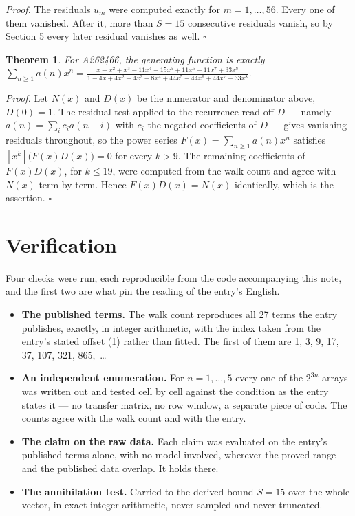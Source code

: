\documentclass[11pt]{article}
\newtheorem{theorem}{Theorem}
\theoremstyle{definition}
\begin{document}
{\itshape Proof.} The residuals $u_m$ were computed exactly for $m = 1,\dots,56$. Every one of them vanished. After it, more than $S = 15$ consecutive residuals vanish, so by Section 5 every later residual vanishes as well. $\square$

\begin{theorem} For A262466, the generating function is exactly $\sum_{n\ge 1} a(n)x^n = \frac{x - x^{2} + x^{3} - 11x^{4} - 15x^{5} + 11x^{6} - 11x^{7} + 33x^{8}}{1 - 4x + 4x^{2} - 4x^{3} - 8x^{4} + 44x^{5} - 44x^{6} + 44x^{7} - 33x^{8}}$.\end{theorem}

{\itshape Proof.} Let $N(x)$ and $D(x)$ be the numerator and denominator above, $D(0)=1$. The residual test applied to the recurrence read off $D$ --- namely $a(n) = \sum_i c_i a(n-i)$ with $c_i$ the negated coefficients of $D$ --- gives vanishing residuals throughout, so the power series $F(x)=\sum_{n\ge 1}a(n)x^n$ satisfies $[x^k]\bigl(F(x)D(x)\bigr) = 0$ for every $k > 9$. The remaining coefficients of $F(x)D(x)$, for $k \le 19$, were computed from the walk count and agree with $N(x)$ term by term. Hence $F(x)D(x) = N(x)$ identically, which is the assertion. $\square$

\section{Verification}

Four checks were run, each reproducible from the code accompanying this note, and the first two are what pin the reading of the entry's English.

\begin{itemize}

\item {\bfseries The published terms.} The walk count reproduces all 27 terms the entry publishes, exactly, in integer arithmetic, with the index taken from the entry's stated offset (1) rather than fitted. The first of them are 1, 3, 9, 17, 37, 107, 321, 865,~\dots

\item {\bfseries An independent enumeration.} For $n = 1,\dots,5$ every one of the $2^{3n}$ arrays was written out and tested cell by cell against the condition as the entry states it --- no transfer matrix, no row window, a separate piece of code. The counts agree with the walk count and with the entry.

\item {\bfseries The claim on the raw data.} Each claim was evaluated on the entry's published terms alone, with no model involved, wherever the proved range and the published data overlap. It holds there.

\item {\bfseries The annihilation test.} Carried to the derived bound $S = 15$ over the whole vector, in exact integer arithmetic, never sampled and never truncated.

\end{itemize}
\end{document}

